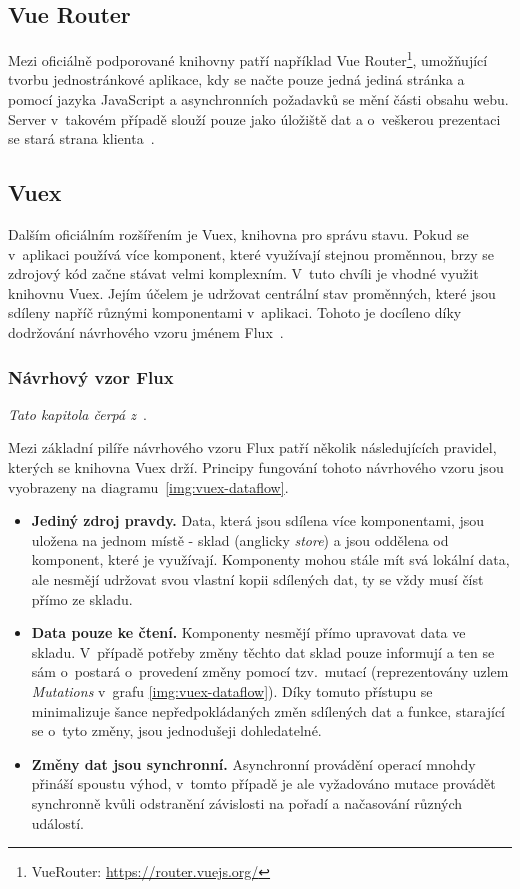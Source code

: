 \subsection{Vue Router}
Mezi oficiálně podporované knihovny patří například Vue Router\footnote{VueRouter: \url{https://router.vuejs.org/}}, umožňující tvorbu jednostránkové aplikace, kdy se načte pouze jedná jediná stránka a pomocí jazyka JavaScript a asynchronních požadavků se mění části obsahu webu. Server v~takovém případě slouží pouze jako úložiště dat a o~veškerou prezentaci se stará strana klienta~\cite{bib:vue-router}. %


\subsection{Vuex}
Dalším oficiálním rozšířením je Vuex, knihovna pro správu stavu. Pokud se v~aplikaci používá více komponent, které využívají stejnou proměnnou, brzy se zdrojový kód začne stávat velmi komplexním. 
V~tuto chvíli je vhodné využit knihovnu Vuex. Jejím účelem je udržovat centrální stav proměnných, které jsou sdíleny napříč různými komponentami v~aplikaci. Tohoto je docíleno díky dodržování návrhového vzoru jménem Flux~\cite{bib:vuex-doc}. 


\subsubsection*{Návrhový vzor Flux}
\emph{Tato kapitola čerpá z~\cite{bib:vuex-guide}}.

Mezi základní pilíře návrhového vzoru Flux patří několik následujících pravidel, kterých se knihovna Vuex drží. Principy fungování tohoto návrhového vzoru jsou vyobrazeny na diagramu~\ref{img:vuex-dataflow}.

\begin{itemize}
    \item \textbf{Jediný zdroj pravdy.} Data, která jsou sdílena více komponentami, jsou uložena na jednom místě - sklad (anglicky \emph{store}) a jsou oddělena od komponent, které je využívají. Komponenty mohou stále mít svá lokální data, ale nesmějí udržovat svou vlastní kopii sdílených dat, ty se vždy musí číst přímo ze skladu.
    \item \textbf{Data pouze ke čtení.} Komponenty nesmějí přímo upravovat data ve skladu. V~případě potřeby změny těchto dat sklad pouze informují a ten se sám o~postará o~provedení změny pomocí tzv.~mutací (reprezentovány uzlem \emph{Mutations} v~grafu \ref{img:vuex-dataflow}). Díky tomuto přístupu se minimalizuje šance nepředpokládaných změn sdílených dat a funkce, starající se o~tyto změny, jsou jednodušeji dohledatelné.
    \item \textbf{Změny dat jsou synchronní.} Asynchronní provádění operací mnohdy přináší spoustu výhod, v~tomto případě je ale vyžadováno mutace provádět synchronně kvůli odstranění závislosti na pořadí a načasování různých událostí.
\end{itemize}

